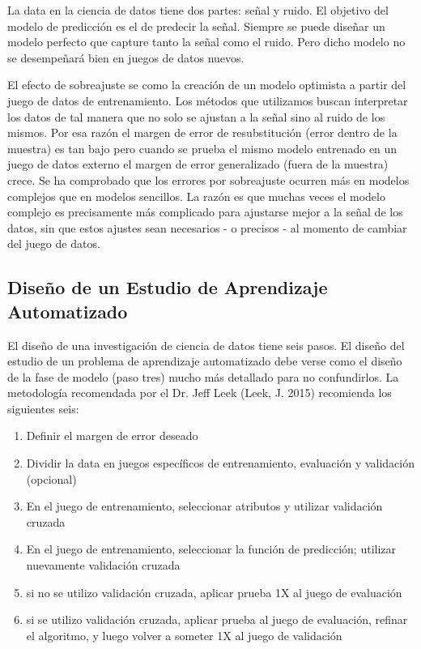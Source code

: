 La data en la ciencia de datos tiene dos partes: señal y ruido. El objetivo del modelo de predicción es el de predecir la señal. Siempre se puede diseñar un modelo perfecto que capture tanto la señal como el ruido. Pero dicho modelo no se desempeñará bien en juegos de datos nuevos.

El efecto de sobreajuste se como la creación de un modelo optimista a partir del juego de datos de entrenamiento. Los métodos que utilizamos buscan interpretar los datos de tal manera que no solo se ajustan a la señal sino al ruido de los mismos. Por esa razón el margen de error de resubstitución (error dentro de la muestra) es tan bajo pero cuando se prueba el mismo modelo entrenado en un juego de datos externo el margen de error generalizado (fuera de la muestra) crece. Se ha comprobado que los errores por sobreajuste ocurren más en modelos complejos que en modelos sencillos. La razón es que muchas veces el modelo complejo es precisamente más complicado para ajustarse mejor a la señal de los datos, sin que estos ajustes sean necesarios - o precisos - al momento de cambiar del juego de datos.

\subsection{Diseño de un Estudio de Aprendizaje Automatizado}
El diseño de una investigación de ciencia de datos tiene seis pasos. El diseño del estudio de un problema de aprendizaje automatizado debe verse como el diseño de la fase de modelo (paso tres) mucho más detallado para no confundirlos. La metodología recomendada por el Dr. Jeff Leek (Leek, J. 2015) recomienda los siguientes seis:

\begin{enumerate}
	\item Definir el margen de error deseado
	\item Dividir la data en juegos específicos de entrenamiento, evaluación y validación (opcional)
	\item En el juego de entrenamiento, seleccionar atributos y utilizar validación cruzada
	\item En el juego de entrenamiento, seleccionar la función de predicción; utilizar nuevamente validación cruzada
	\item si no se utilizo validación cruzada, aplicar prueba 1X al juego de evaluación
	\item si se utilizo validación cruzada, aplicar prueba al juego de evaluación, refinar el algoritmo, y luego volver a someter 1X al juego de validación
\end{enumerate}

